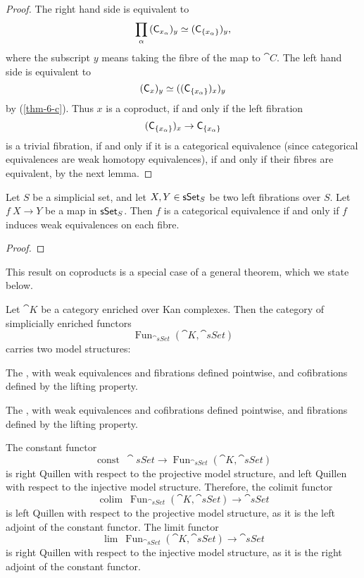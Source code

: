 \begin{proof}
    The right hand side is equivalent to  
    \[ \prod_\alpha{}(\mathsf{C}_{x_\alpha\/})_y
    \simeq (\mathsf{C}_{\{x_\alpha\}\/})_y, \]
    where the subscript $y$ means taking the fibre of the map to $\cat C$.
    The left hand side is equivalent to 
    \[ (\mathsf{C}_{x\/})_y\simeq((\mathsf{C}_{\{x_\alpha\}\/})_{x\/})_y \]
    by (\ref{thm-6-c}). Thus $x$ is a coproduct, if and only if the left fibration
    \[(\mathsf{C}_{\{x_\alpha\}\/})_{x\/}\to\mathsf{C}_{\{x_\alpha\}\/}\]
    is a trivial fibration,
    if and only if it is a categorical equivalence (since categorical equivalences are weak homotopy equivalences),
    if and only if their fibres are equivalent, by the next lemma.
\end{proof}

\begin{lemma}
    Let $S$ be a simplicial set, and let $X,Y\in\mathsf{sSet}_{\/S}$
    be two left fibrations over $S$.
    Let $f\:X\to Y$ be a map in $\mathsf{sSet}_{\/S}$.
    Then $f$ is a categorical equivalence if and only if 
    $f$ induces weak equivalences on each fibre.
\end{lemma}

\begin{proof}
    \nyw
\end{proof}

This result on coproducts is a special case of a general theorem,
which we state below.

Let $\cat K$ be a category enriched over Kan complexes.
Then the category of simplicially enriched functors
\[ \operatorname{Fun}_{\cat{sSet}}(\cat K,\cat{sSet}) \]
carries two model structures:
\begin{itms}
    \item The ,
    with weak equivalences and fibrations defined pointwise,
    and cofibrations defined by the lifting property.
    \item The ,
    with weak equivalences and cofibrations defined pointwise,
    and fibrations defined by the lifting property.
\end{itms}
The constant functor
\[ \operatorname{const}\:\cat{sSet}\to\operatorname{Fun}_{\cat{sSet}}(\cat K,\cat{sSet}) \]
is right Quillen with respect to the projective model structure,
and left Quillen with respect to the injective model structure.
Therefore, the colimit functor 
\[ \operatorname{colim}\:\operatorname{Fun}_{\cat{sSet}}(\cat K,\cat{sSet})\to\cat{sSet} \]
is left Quillen with respect to the projective model structure,
as it is the left adjoint of the constant functor.
The limit functor 
\[ \operatorname{lim}\:\operatorname{Fun}_{\cat{sSet}}(\cat K,\cat{sSet})\to\cat{sSet} \]
is right Quillen with respect to the injective model structure,
as it is the right adjoint of the constant functor.

